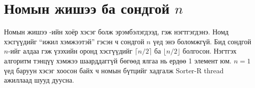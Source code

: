 \section{Номын жишээ ба сондгой $n$}
Номын жишээ -ийн хоёр хэсэг  болж эрэмбэлэгдээд,
 гэж нэгтгэгдэнэ. Номд хэсгүүдийг “ижил хэмжээтэй” гэсэн ч сондгой $n$ үед энэ
боломжгүй. Бид сондгой $n$-ийг алдаа гэж үзэхийн оронд хэсгүүдийг $\lceil n/2\rceil$ ба $\lfloor n/2\rfloor$ болгосон.
Нэгтгэх алгоритм тэнцүү хэмжээ шаарддаггүй бөгөөд ялгаа нь ердөө 1 элемент юм. $n = 1$ үед баруун хэсэг хоосон
байх ч номын бүтцийг хадгалж Sorter-R thread ажиллаад шууд дуусна.
